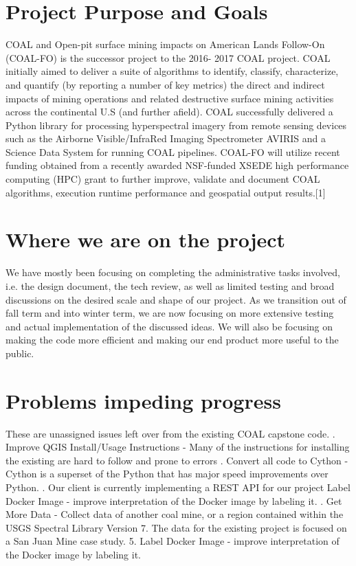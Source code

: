 \documentclass[onecolumn, draftclsnofoot,10pt, compsoc]{IEEEtran}
\begin{document}
\section{Project Purpose and Goals}

COAL and Open-pit surface mining impacts on American Lands Follow-On (COAL-FO) is the successor project to
the 2016- 2017 COAL project. COAL initially aimed to deliver a suite of algorithms to identify, classify, characterize,
and quantify (by reporting a number of key metrics) the direct and indirect impacts of mining operations and related
destructive surface mining activities across the continental U.S (and further afield). COAL successfully delivered a
Python library for processing hyperspectral imagery from remote sensing devices such as the Airborne Visible/InfraRed
Imaging Spectrometer AVIRIS and a Science Data System for running COAL pipelines. COAL-FO will utilize recent
funding obtained from a recently awarded NSF-funded XSEDE high performance computing (HPC) grant to further
improve, validate and document COAL algorithms, execution runtime performance and geospatial output results.[1]

\section{Where we are on the project}

We have mostly been focusing on completing the administrative tasks involved, i.e. the design document, the tech review, as well as limited testing and broad discussions on the desired scale and shape of our project. As we transition out of fall term and into winter term, we are now focusing on more extensive testing and actual implementation of the discussed ideas. We will also be focusing on making the code more efficient and making our end product more useful to the public.

\section{Problems impeding progress}
These are unassigned issues left over from the existing COAL capstone code. . Improve QGIS Install/Usage Instructions - Many of the instructions for installing the existing are hard to follow and prone to errors . Convert all code to Cython - Cython is a superset of the Python that has major speed improvements over Python. . Our client is currently implementing a REST API for our project
Label Docker Image - improve interpretation of the Docker image by labeling it. . Get More Data - Collect data of another coal mine, or a region contained within the USGS Spectral Library Version 7. The data for the existing project is focused on a San Juan Mine case study.
5. Label Docker Image - improve interpretation of the Docker image by labeling it.
\end{document}
